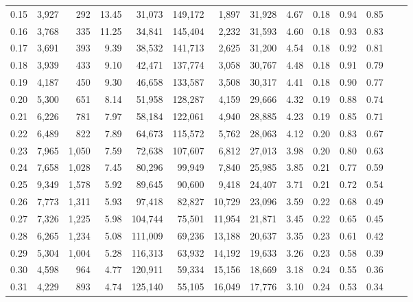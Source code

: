 \begin{tabular}{rrrrrrrrrrrrrr}
0.15 &  3,927 &    292 &   13.45 &   31,073 &  149,172 &   1,897 &  31,928 &  4.67 &  0.18 &  0.94 &      0.85 \\
0.16 &  3,768 &    335 &   11.25 &   34,841 &  145,404 &   2,232 &  31,593 &  4.60 &  0.18 &  0.93 &      0.83 \\
0.17 &  3,691 &    393 &    9.39 &   38,532 &  141,713 &   2,625 &  31,200 &  4.54 &  0.18 &  0.92 &      0.81 \\
0.18 &  3,939 &    433 &    9.10 &   42,471 &  137,774 &   3,058 &  30,767 &  4.48 &  0.18 &  0.91 &      0.79 \\
0.19 &  4,187 &    450 &    9.30 &   46,658 &  133,587 &   3,508 &  30,317 &  4.41 &  0.18 &  0.90 &      0.77 \\
0.20 &  5,300 &    651 &    8.14 &   51,958 &  128,287 &   4,159 &  29,666 &  4.32 &  0.19 &  0.88 &      0.74 \\
0.21 &  6,226 &    781 &    7.97 &   58,184 &  122,061 &   4,940 &  28,885 &  4.23 &  0.19 &  0.85 &      0.71 \\
0.22 &  6,489 &    822 &    7.89 &   64,673 &  115,572 &   5,762 &  28,063 &  4.12 &  0.20 &  0.83 &      0.67 \\
0.23 &  7,965 &  1,050 &    7.59 &   72,638 &  107,607 &   6,812 &  27,013 &  3.98 &  0.20 &  0.80 &      0.63 \\
0.24 &  7,658 &  1,028 &    7.45 &   80,296 &   99,949 &   7,840 &  25,985 &  3.85 &  0.21 &  0.77 &      0.59 \\
0.25 &  9,349 &  1,578 &    5.92 &   89,645 &   90,600 &   9,418 &  24,407 &  3.71 &  0.21 &  0.72 &      0.54 \\
0.26 &  7,773 &  1,311 &    5.93 &   97,418 &   82,827 &  10,729 &  23,096 &  3.59 &  0.22 &  0.68 &      0.49 \\
0.27 &  7,326 &  1,225 &    5.98 &  104,744 &   75,501 &  11,954 &  21,871 &  3.45 &  0.22 &  0.65 &      0.45 \\
0.28 &  6,265 &  1,234 &    5.08 &  111,009 &   69,236 &  13,188 &  20,637 &  3.35 &  0.23 &  0.61 &      0.42 \\
0.29 &  5,304 &  1,004 &    5.28 &  116,313 &   63,932 &  14,192 &  19,633 &  3.26 &  0.23 &  0.58 &      0.39 \\
0.30 &  4,598 &    964 &    4.77 &  120,911 &   59,334 &  15,156 &  18,669 &  3.18 &  0.24 &  0.55 &      0.36 \\
0.31 &  4,229 &    893 &    4.74 &  125,140 &   55,105 &  16,049 &  17,776 &  3.10 &  0.24 &  0.53 &      0.34 \\

\end{tabular}
